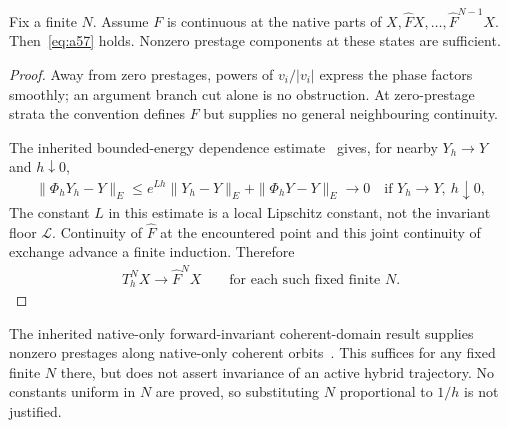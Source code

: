 \begin{proposition}\label{prop:finiteN}
Fix a finite $N$. Assume $F$ is continuous at the native parts of $X,\widehat FX,\ldots,\widehat F^{N-1}X$. Then~\eqref{eq:a57} holds. Nonzero prestage components at these states are sufficient.
\end{proposition}
\begin{proof}
Away from zero prestages, powers of $v_i/|v_i|$ express the phase factors smoothly; an argument branch cut alone is no obstruction. At zero-prestage strata the convention defines $F$ but supplies no general neighbouring continuity.

The inherited bounded-energy dependence estimate~\cite[Theorem 3.1]{rx} gives, for nearby $Y_h\to Y$ and $h\downarrow0$,
\begin{equation}\label{eq:a56}%
\begin{gathered}
\|\Phi_hY_h-Y\|_E
\le e^{Lh}\|Y_h-Y\|_E+\|\Phi_hY-Y\|_E\longrightarrow0
\quad\text{if }Y_h\to Y,\ h\downarrow0,
\end{gathered}
\end{equation}
The constant $L$ in this estimate is a local Lipschitz constant, not the invariant floor $\mathcal L$. Continuity of $\widehat F$ at the encountered point and this joint continuity of exchange advance a finite induction. Therefore
\begin{equation}\label{eq:a57}%
\begin{gathered}
T_h^NX\longrightarrow\widehat F^NX\qquad\text{for each such fixed finite }N.
\end{gathered}
\end{equation}
\end{proof}
The inherited native-only forward-invariant coherent-domain result supplies nonzero prestages along native-only coherent orbits~\cite[Section 6, native domain]{rx}. This suffices for any fixed finite $N$ there, but does not assert invariance of an active hybrid trajectory. No constants uniform in $N$ are proved, so substituting $N$ proportional to $1/h$ is not justified.
